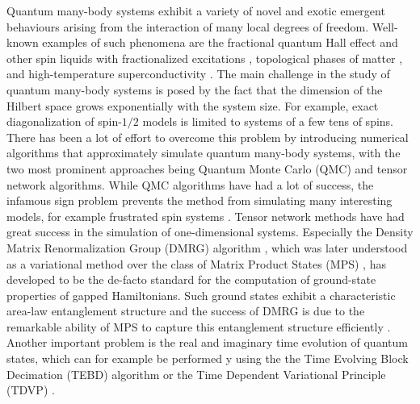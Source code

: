 Quantum many-body systems exhibit a variety of novel and exotic emergent behaviours arising from the interaction of many local degrees of freedom. Well-known examples of such phenomena are the fractional quantum Hall effect \cite{cite:two_dimensional_magnetotransport_in_the_extreme_quantum_limit, cite:anomalous_quantum_hall_effect_an_incompressible_quantum_fluid_with_fractionally_charged_excitations, cite:the_fractional_QHE} and other spin liquids with fractionalized excitations \cite{cite:fractionalized_excitations_in_the_spin_liquid_state_of_a_kagome_lattice_AFM}, topological phases of matter \cite{cite:colloqium_zoo_of_quantum_topological_phases_of_matter}, and high-temperature superconductivity \cite{cite:possible_high_T_c_superconductivity_in_the_Ba_La_Cu_O_system, cite:doping_a_mott_insulator_physics_of_high_temperature_superconductivity}. The main challenge in the study of quantum many-body systems is posed by the fact that the dimension of the Hilbert space grows exponentially with the system size. For example, exact diagonalization of spin-$1/2$ models is limited to systems of a few tens of spins. There has been a lot of effort to overcome this problem by introducing numerical algorithms that approximately simulate quantum many-body systems, with the two most prominent approaches being Quantum Monte Carlo (QMC) \cite{cite:quantum_monte_carlo_simulation_method_for_spin_systems, cite:computational_studies_of_quantum_spin_systems} and tensor network algorithms. While QMC algorithms have had a lot of success, the infamous sign problem prevents the method from simulating many interesting models, for example frustrated spin systems \cite{cite:computational_studies_of_quantum_spin_systems, cite:sign_problem_in_numerical_simulation_of_many_electron_systems}. Tensor network methods have had great success in the simulation of one-dimensional systems. Especially the Density Matrix Renormalization Group (DMRG) algorithm \cite{cite:density_matrix_formulation_for_quantum_renormalization_groups}, which was later understood as a variational method over the class of Matrix Product States (MPS) \cite{cite:equivalence_of_the_variational_mps_and_the_dmrg_applied_to_spin_chains, cite:DMRG_in_the_age_of_MPS, cite:practical_introduction_MPS_and_PEPS}, has developed to be the de-facto standard for the computation of ground-state properties of gapped Hamiltonians. Such ground states exhibit a characteristic area-law entanglement structure \cite{cite:area_law_1D_proof} and the success of DMRG is due to the remarkable ability of MPS to capture this entanglement structure efficiently \cite{cite:area_laws_review, cite:mps_represent_ground_states_faithfully}. Another important problem is the real and imaginary time evolution of quantum states, which can for example be performed y using the the Time Evolving Block Decimation (TEBD) \cite{cite:efficient_simulation_of_1D_quantum_many_body_systems} algorithm or the Time Dependent Variational Principle (TDVP) \cite{cite:time_dependent_variational_principle_for_quantum_lattices}.
